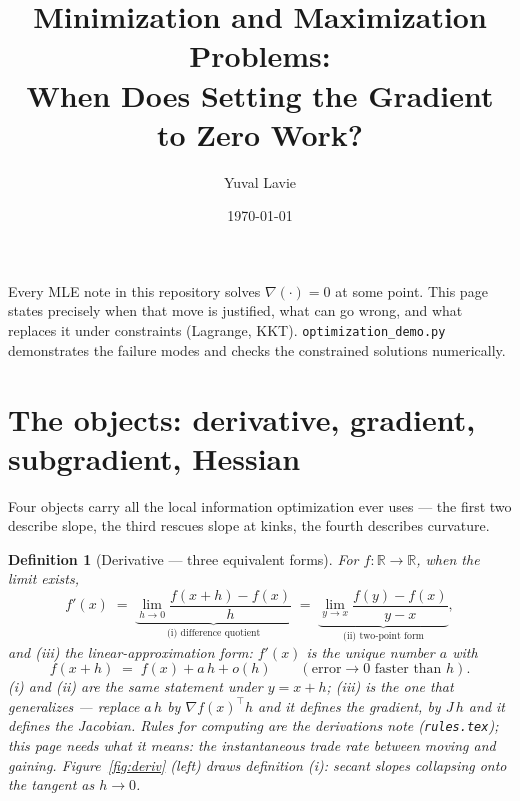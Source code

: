\documentclass[11pt]{article}
\title{Minimization and Maximization Problems:\\
When Does Setting the Gradient to Zero Work?}
\author{Yuval Lavie}
\date{\today}
\newtheorem{definition}{Definition}
\begin{document}
\maketitle

\noindent
Every MLE note in this repository solves $\nabla(\cdot) = 0$ at some
point. This page states precisely when that move is justified, what can go
wrong, and what replaces it under constraints (Lagrange, KKT).
\texttt{optimization\_demo.py} demonstrates the failure modes and checks
the constrained solutions numerically.

\section{The objects: derivative, gradient, subgradient, Hessian}

Four objects carry all the local information optimization ever uses ---
the first two describe slope, the third rescues slope at kinks, the
fourth describes curvature.

\begin{definition}[Derivative --- three equivalent forms]
For $f:\mathbb{R}\to\mathbb{R}$, when the limit exists,
\begin{equation}
  f'(x)
  \;=\; \underbrace{\lim_{h\to 0}\frac{f(x+h)-f(x)}{h}}_{\text{(i)
  difference quotient}}
  \;=\; \underbrace{\lim_{y\to x}\frac{f(y)-f(x)}{y-x}}_{\text{(ii)
  two-point form}},
  \label{eq:derivative}
\end{equation}
and (iii) the \emph{linear-approximation form}: $f'(x)$ is the unique
number $a$ with
\begin{equation}
  f(x+h) \;=\; f(x) + a\,h + o(h)
  \qquad (\text{error} \to 0 \text{ faster than } h).
  \label{eq:derivlittleo}
\end{equation}
(i) and (ii) are the same statement under $y = x+h$; (iii) is the one
that \emph{generalizes} --- replace $a\,h$ by $\nabla f(x)^\top h$ and
it defines the gradient, by $J\,h$ and it defines the Jacobian. Rules
for computing are the derivations note (\texttt{rules.tex}); this page
needs what it means: the instantaneous trade rate between moving and
gaining. Figure~\ref{fig:deriv} (left) draws definition (i): secant
slopes collapsing onto the tangent as $h \to 0$.
\end{definition}
\end{document}
